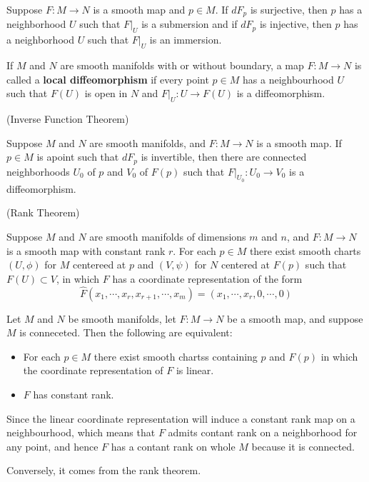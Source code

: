 \begin{proposition}
    Suppose $F:M\to N$ is a smooth map and $p\in M$. If $dF_p$ is surjective, then $p$ has a neighborhood $U$ such that $F|_U$ is a submersion and if $dF_p$ is injective, then $p$ has a  neighborhood $U$ such that $F|_U$ is an immersion.
\end{proposition}

\begin{definition}
    If $M$ and $N$ are smooth manifolds with or without boundary, a map $F:M\to N$ is called a \textbf{local diffeomorphism} if every point $p\in M$ has a neighbourhood $U$ such that $F(U)$ is open in $N$ and $F|_U:U\to F(U)$ is a diffeomorphism.  
\end{definition}

\begin{theorem}(Inverse Function Theorem)\par
    Suppose $M$ and $N$ are smooth manifolds, and $F:M\to N$ is a smooth map. If $p\in M$ is apoint such that $dF_p$ is invertible, then there are connected neighborhoods $U_0$ of $p$ and $V_0$ of $F(p)$ such that $F|_{U_0}:U_0 \to V_0$ is a diffeomorphism.
\end{theorem}

\begin{theorem}(Rank Theorem)\par
    Suppose $M$ and $N$ are smooth manifolds of dimensions $m$ and $n$, and $F:M\to N$ is a smooth map with constant rank $r$. For each $p\in M$ there exist smooth charts $(U,\phi)$ for $M$ centereed at $p$ and $(V,\psi)$ for $N$ centered at $F(p)$ such that $F(U)\subset V$, in which $F$ has a coordinate representation of the form
    \[\hat{F}(x_1,\cdots,x_r,x_{r+1},\cdots,x_m) = (x_1,\cdots,x_r,0,\cdots,0)\]
\end{theorem}

\begin{corollary}
    Let $M$ and $N$ be smooth manifolds, let $F:M\to N$ be a smooth map, and suppose $M$ is conneceted. Then the following are equivalent:
    \begin{itemize}
        \item For each $p\in M$ there exist smooth chartss containing $p$ and $F(p)$ in which the coordinate representation of $F$ is linear.
        \item $F$ has constant rank.
    \end{itemize}
\end{corollary}
\Pf\par
    Since the linear coordinate representation will induce a constant rank map on a neighbourhood, which means that $F$ admits contant rank on a neighborhood for any point, and hence $F$ has a contant rank on whole $M$ because it is connected.\par
    Conversely, it comes from the rank theorem.

